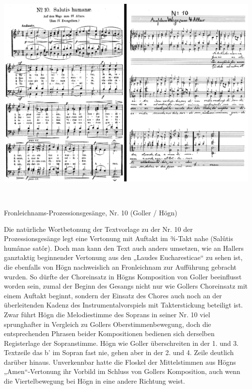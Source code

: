 \includegraphics[width=15.967cm,height=11.599cm]{pictures/zulassungsarbeit-img084.png}

\begin{figure}
\img{}
\caption{}
\end{figure}

Fronleichnams-Prozessionsgesänge, Nr.
10 (Goller / Högn)

Die natürliche Wortbetonung der Textvorlage zu der Nr. 10 der
Prozessionsgesänge legt eine Vertonung mit Auftakt im ¾-Takt nahe
(Salûtis humânae satôr). Doch man kann den Text auch anders umsetzen,
wie an Hallers ganztaktig beginnender Vertonung aus den „Laudes
Eucharesticae“ zu sehen ist, die ebenfalls von Högn nachweislich an
Fronleichnam zur Aufführung gebracht wurden. So dürfte der Choreinsatz
in Högns Komposition von Goller beeinflusst worden sein, zumal der
Beginn des Gesangs nicht nur wie Gollers Choreinsatz mit einem Auftakt
beginnt, sondern der Einsatz des Chores auch noch an der überleitenden
Kadenz des Instrumentalvorspiels mit Takterstickung beteiligt ist. Zwar
führt Högn die Melodiestimme des Soprans in seiner Nr. 10 viel
sprunghafter in Vergleich zu Gollers Oberstimmenbewegung, doch die
entsprechenden Phrasen beider Kompositionen bedienen sich derselben
Registerlage der Sopranstimme. Högn wie Goller überschreiten in der 1.
und 3. Textzeile das b’ im Sopran fast nie, gehen aber in der 2. und 4.
Zeile deutlich darüber hinaus. Unverkennbar hatte die Floskel der
Mittelstimmen aus Högns „Amen“-Vertonung ihr Vorbild im Schluss von
Gollers Komposition, auch wenn die Viertelbewegung bei Högn in eine
andere Richtung weist.

